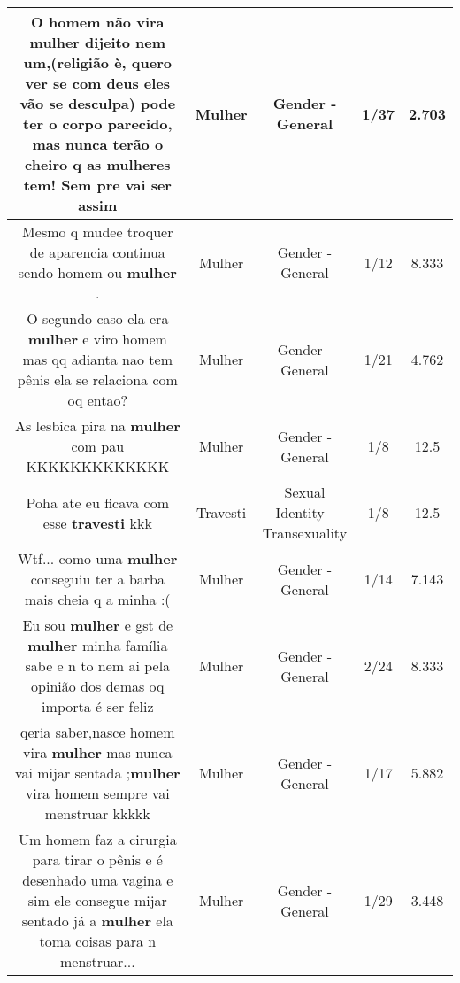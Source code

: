 \documentclass[11pt]{article}
\newlength\mylength
\begin{document}
\begin{center}
\begin{longtable}{|C{.65\mylength}|C{.30\mylength}|C{.12\mylength}|C{.12\mylength}|C{.12\mylength}|}
  \small O homem não vira \textbf{mulher} dijeito nem um,(religião è, quero ver se com deus eles vão se desculpa)  pode ter o corpo parecido, mas nunca terão o cheiro q as mulheres tem! Sem pre vai ser assim\normalsize   & Mulher & Gender - General & 1/37 & 2.703 \\  \hline
  \small Mesmo q mudee troquer de aparencia continua sendo homem ou \textbf{mulher} .\normalsize   & Mulher & Gender - General & 1/12 & 8.333 \\  \hline
  \small O segundo caso ela era \textbf{mulher}  e viro homem  mas qq adianta  nao tem pênis ela se relaciona com oq entao?\normalsize   & Mulher & Gender - General & 1/21 & 4.762 \\  \hline
  \small As lesbica pira na \textbf{mulher} com pau KKKKKKKKKKKKK\normalsize   & Mulher & Gender - General & 1/8 & 12.5 \\  \hline
  \small Poha ate eu ficava com esse \textbf{travesti} kkk\normalsize   & Travesti & Sexual Identity - Transexuality & 1/8 & 12.5 \\  \hline
  \small Wtf... como uma \textbf{mulher} conseguiu ter a barba mais cheia q a minha :(\normalsize   & Mulher & Gender - General & 1/14 & 7.143 \\  \hline
  \small Eu sou \textbf{mulher} e gst de \textbf{mulher} minha família sabe e n to nem ai pela opinião dos demas oq importa é ser feliz\normalsize   & Mulher & Gender - General & 2/24 & 8.333 \\  \hline
  \small qeria saber,nasce homem vira \textbf{mulher} mas nunca vai mijar sentada ;\textbf{mulher} vira homem sempre  vai menstruar kkkkk\normalsize   & Mulher & Gender - General & 1/17 & 5.882 \\  \hline
  \small Um homem faz a cirurgia para tirar o pênis e é desenhado uma vagina e sim ele consegue mijar sentado já a \textbf{mulher} ela toma coisas para n menstruar...\normalsize   & Mulher & Gender - General & 1/29 & 3.448 \\  \hline

\end{longtable}
\end{center}
\end{document}
